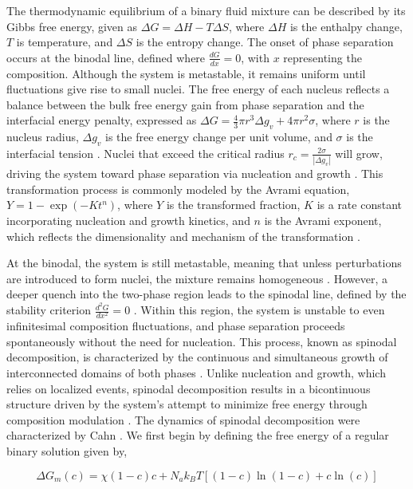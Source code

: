 The thermodynamic equilibrium of a binary fluid mixture can be described by its Gibbs free energy, given as $\Delta G = \Delta H - T \Delta S$, where \(\Delta H\) is the enthalpy change, 
\(T\) is temperature, and \(\Delta S\) is the entropy change. The onset of phase separation occurs at the binodal line, defined where \(\frac{dG}{dx} = 0\), with \(x\) representing the composition. 
Although the system is metastable, it remains uniform until fluctuations give rise to small nuclei. The free energy of each nucleus reflects a 
balance between the bulk free energy gain from phase separation and the interfacial energy penalty, expressed as \(\Delta G = \frac{4}{3}\pi r^3 \Delta g_v + 4 \pi r^2 \sigma\), where \(r\) is 
the nucleus radius, \(\Delta g_v\) is the free energy change per unit volume, and \(\sigma\) is the interfacial tension \cite{thanh_mechanisms_2014}. 
Nuclei that exceed the critical radius \(r_c = \frac{2\sigma}{|\Delta g_v|}\) will grow, driving the system toward phase separation via nucleation and growth \cite{thanh_mechanisms_2014}. 
This transformation process is commonly modeled by the Avrami equation, \(Y = 1 - \exp(-K t^n)\), where \(Y\) is the 
transformed fraction, \(K\) is a rate constant incorporating nucleation and growth kinetics, and \(n\) is the Avrami exponent, which reflects the dimensionality and mechanism of the transformation
\cite{avrami_kinetics_1939}.

At the binodal, the system is still metastable, meaning that unless perturbations are introduced to form nuclei, the mixture remains homogeneous \cite{thanh_mechanisms_2014}.
However, a deeper quench into the two-phase region leads to the spinodal line, defined by the stability criterion \(\frac{d^2G}{dx^2} = 0\) \cite{cahn_free_1958}. 
Within this region, the system is unstable to even infinitesimal composition fluctuations, and phase 
separation proceeds spontaneously without the need for nucleation. This process, known as spinodal decomposition, is characterized by the continuous and simultaneous growth of interconnected 
domains of both phases \cite{cahn_free_1958}. Unlike nucleation and growth, which relies on localized events, spinodal decomposition 
results in a bicontinuous structure driven by the system's attempt to minimize 
free energy through composition modulation \cite{cahn_free_1958}. The dynamics of spinodal decomposition were characterized by Cahn \cite{cahn_spinodal_1961}. 
We first begin by defining the free energy of a regular binary solution given by,

\begin{equation}
    \Delta G_m (c) = \chi (1 - c)c + N_a k_B T \left[(1 - c)\ln(1 - c) + c \ln(c)\right]
\end{equation}

